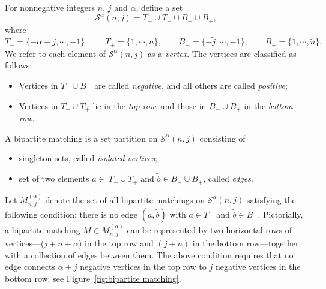 \documentclass{amsart}
\theoremstyle{plain}
\theoremstyle{remark}
\numberwithin{equation}{section}
\begin{document}
For nonnegative integers $n$, $j$ and $\alpha$, define a set
\begin{equation}
    \mathcal{S}^{\alpha}(n,j)=T_{-}\cup T_{+}\cup B_{-}\cup B_{+},
\end{equation}
where
\begin{equation}
    T_{-}=\{-\alpha-j,\cdots,-1\},\qquad T_{+}=\{1,\cdots,n\},\qquad B_{-}=\{-\widetilde{j},\cdots,-\widetilde{1}\},\qquad B_{+}=\{\widetilde{1},\cdots,\widetilde{n}\}.
\end{equation}
We refer to each element of $\mathcal{S}^{\alpha}(n,j)$ as a \emph{vertex}. 
The vertices are classified as follows:
\begin{itemize}
    \item Vertices in $T_{-}\cup B_{-}$ are called \emph{negative}, and all others are called \emph{positive}; 
    \smallskip
    \item Vertices in $T_{-} \cup T_{+}$ lie in the \emph{top row}, and those in $B_{-}\cup B_{+}$ in the \emph{bottom row}.
\end{itemize}
A bipartite matching is a set partition on $\mathcal{S}^{\alpha}(n,j)$ consisting of
\begin{itemize}
    \item singleton sets, called \emph{isolated vertices};
    \smallskip 
    \item set of two elements $a\in\ T_{-}\cup T_{+}$ and $\tilde{b}\in B_{-}\cup B_{+}$, called \emph{edges}.
\end{itemize}

Let $M_{n,j}^{(\alpha)}$ denote the set of all bipartite matchings on $\mathcal{S}^{\alpha}(n,j)$ satisfying the following condition: there is no edge $(a,\tilde{b})$ with $a\in T_{-}$ and $\widetilde{b}\in B_{-}$. Pictorially, a bipartite matching $M \in M_{n,j}^{(\alpha)}$ can be represented by two horizontal rows of vertices---($j+n+\alpha$) in the top row and $(j+n)$ in the bottom row---together with a collection of edges between them. The above condition requires that no edge connects $\alpha+j$ negative vertices in the top row to $j$ negative vertices in the bottom row; see Figure~\ref{fig:bipartite matching}.
\end{document}
